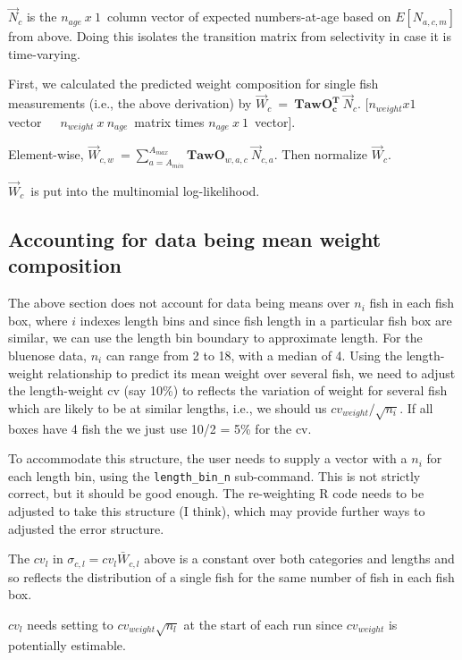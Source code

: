 \documentclass[a4paper,11pt,twoside,pdftex,draft]{article}
\begin{document}
$\overrightarrow N_{c}$ is the $n_{age}\ x\ 1$\ column vector of expected numbers-at-age based on $E[N_{a,c,m}]$ from above. Doing this isolates the transition matrix from selectivity in case it is time-varying.

First, we calculated the predicted weight composition for single fish measurements (i.e., the above derivation) by $\overrightarrow W_{c}\ =\ \mathbf{TawO_{c}^T}\ \overrightarrow N_{c}$.
[$n_{weight}x1$ vector\ \ \ $n_{weight}\ x\ n_{age}$\ matrix times $n_{age}\ x\ 1$\ vector]. 

Element-wise, $\overrightarrow W_{c,w}\ = \sum_{a=A_{min}}^{A_{max}}  \mathbf{TawO}_{w,a,c}  \ \overrightarrow N_{c,a}$.
Then normalize $\overrightarrow W_{c}$.

$\overrightarrow W_{c}$\ is put into the multinomial log-likelihood. 


\subsection{Accounting for data being mean weight composition}

The above section does not account for data being means over $n_i$ fish in each fish box, where $i$ indexes length bins and since fish length  in a particular fish box are similar, we can use the length bin boundary to approximate length. For the bluenose data, $n_i$ can range from 2 to 18, with a median of 4. 
Using the length-weight relationship to predict its mean weight over several fish, we need to adjust the 
 length-weight cv (say 10\%) to reflects the variation of weight for several fish which are likely to be at similar lengths, i.e., we should us $cv_{weight}/\sqrt{n_{i}}$. If all boxes have 4 fish the we just use 10/2 = 5\% for the cv.

To accommodate this structure, the user needs to supply a vector with a $n_i$ for each length bin, using the \texttt{length\_bin\_n} sub-command. This is not strictly correct, but it should be good enough. The re-weighting R code needs to be adjusted to take this structure (I think), which may provide further ways to adjusted the error structure.

The $cv_{l}$ in $\sigma_{c,l}= cv_{l} \bar W_{c,l}$ above is a constant over both categories and lengths and so reflects the distribution of a single fish for the same number of fish in each fish box.
 
$cv_{l}$ needs setting to $ cv_{weight} \sqrt{n_{l}}$ at the start of each run since $ cv_{weight}$ is potentially estimable. 
\end{document}
